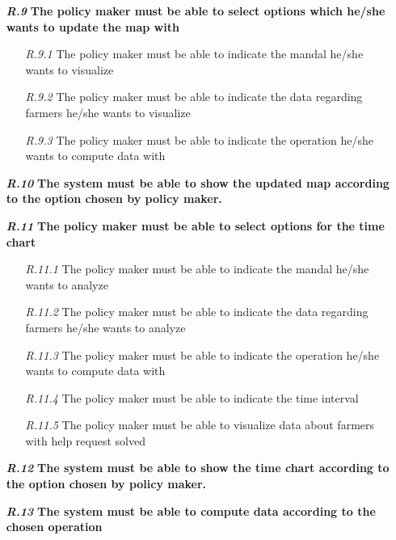 \begin{itemize}
        \item[\textbf{\textit{R.9}}] \textbf{The policy maker must be able to select options which he/she wants to update the map with}
        \begin{itemize}
            \item [\textit{R.9.1}] The policy maker must be able to indicate the mandal he/she wants to visualize
	        \item [\textit{R.9.2}] The policy maker must be able to indicate the data regarding farmers he/she wants to visualize
	        \item [\textit{R.9.3}] The policy maker must be able to indicate the operation he/she wants to compute data with
        \end{itemize}
        \item [\textbf{\textit{R.10}}] \textbf{The system must be able to show the updated map according to the option chosen by policy maker.}
        \item [\textbf{\textit{R.11}}] \textbf{The policy maker must be able to select options for the time chart}
        \begin{itemize}
            \item [\textit{R.11.1}] The policy maker must be able to indicate the mandal he/she wants to analyze
            \item [\textit{R.11.2}] The policy maker must be able to indicate the data regarding farmers he/she wants to analyze
            \item [\textit{R.11.3}] The policy maker must be able to indicate the operation he/she wants to compute data with
            \item [\textit{R.11.4}] The policy maker must be able to indicate the time interval
            \item [\textit{R.11.5}] The policy maker must be able to visualize data about farmers with help request solved
        \end{itemize}
        \item [\textbf{\textit{R.12}}] \textbf{The system must be able to show the time chart according to the option chosen by policy maker.}
        \item [\textbf{\textit{R.13}}]\textbf{The system must be able to compute data according to the chosen operation}
        

\end{itemize}
